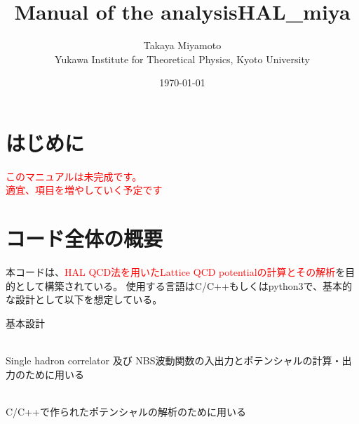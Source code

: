 \documentclass[12pt, a4paper]{jsarticle}
\title{Manual of the analysisHAL\_miya}
\author{
Takaya Miyamoto \\
{\small Yukawa Institute for Theoretical Physics, Kyoto University}
}
\date{\today}
\begin{document}
\maketitle
\tableofcontents
\newpage
\section*{はじめに}
{\huge \textcolor{red}{このマニュアルは未完成です。\\適宜、項目を増やしていく予定です}\\}
\section{コード全体の概要}
本コードは、\textcolor{red}{HAL QCD法を用いたLattice QCD potentialの計算とその解析}を目的として構築されている。
使用する言語はC/C++もしくはpython3で、基本的な設計として以下を想定している。\\
\begin{itembox}[l]{基本設計}
	\begin{description}
		\setlength{\itemsep}{0.3cm}
		\item[C/C++] \mbox{} \\
		Single hadron correlator 及び NBS波動関数の入出力とポテンシャルの計算・出力のために用いる
		\setlength{\itemsep}{0.3cm}
		\item[python3] \mbox{} \\
		C/C++で作られたポテンシャルの解析のために用いる
	\end{description}
\end{itembox} \\
\end{document}
